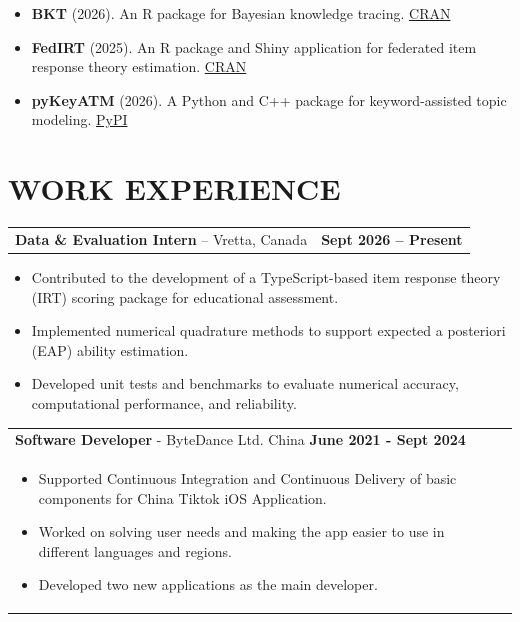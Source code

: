 \documentclass[a4paper,12pt]{article}
\begin{document}
\begin{itemize}[nosep, leftmargin=1em, itemsep=3pt]

    \item \textbf{BKT} (2026).
    An R package for Bayesian knowledge tracing.
    \href{https://cran.r-project.org/web/packages/BKT/index.html}{CRAN}

    \item \textbf{FedIRT} (2025).
    An R package and Shiny application for federated item response theory estimation.
    \href{https://cran.r-project.org/web/packages/FedIRT/index.html}{CRAN}

    \item \textbf{pyKeyATM} (2026).
    A Python and C++ package for keyword-assisted topic modeling.
    \href{https://pypi.org/project/pykeyatm/}{PyPI}

\end{itemize}



\hfill
\section{\textbf{WORK EXPERIENCE}}
\begin{tabularx}{\linewidth}{@{}X r@{}}
\textbf{Data \& Evaluation Intern} -- Vretta, Canada &
\textbf{Sept 2026 -- Present} \\[4pt]
\end{tabularx}

\begin{itemize}[nosep, leftmargin=1em, itemsep=2pt]
    \item Contributed to the development of a TypeScript-based item response theory (IRT) scoring package for educational assessment.
    \item Implemented numerical quadrature methods to support expected a posteriori (EAP) ability estimation.
    \item Developed unit tests and benchmarks to evaluate numerical accuracy, computational performance, and reliability.
\end{itemize}
\begin{tabularx}{\linewidth}{ @{}l r@{} }
\textbf{Software Developer} - ByteDance Ltd. China \hfill \textbf{June 2021 - Sept 2024} \\[4pt]
\begin{minipage}[t]{\linewidth}
    \begin{itemize}[nosep,after=\strut, leftmargin=1em, itemsep=2pt]
        \item Supported Continuous Integration and Continuous Delivery of basic components for China Tiktok iOS Application.
        \item Worked on solving user needs and making the app easier to use in different languages and regions.
        \item Developed two new applications as the main developer.
    \end{itemize}
\end{minipage}
\end{tabularx}
\end{document}
